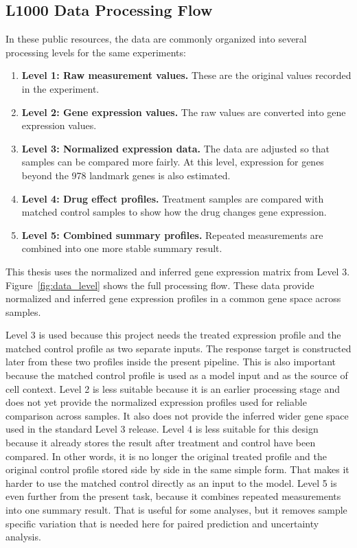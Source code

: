 \subsection{L1000 Data Processing Flow}
In these public resources, the data are commonly organized into several processing levels for the same experiments:
\begin{enumerate}
\item \textbf{Level 1: Raw measurement values.} These are the original values recorded in the experiment.
\item \textbf{Level 2: Gene expression values.} The raw values are converted into gene expression values.
\item \textbf{Level 3: Normalized expression data.} The data are adjusted so that samples can be compared more fairly. At this level, expression for genes beyond the 978 landmark genes is also estimated.
\item \textbf{Level 4: Drug effect profiles.} Treatment samples are compared with matched control samples to show how the drug changes gene expression.
\item \textbf{Level 5: Combined summary profiles.} Repeated measurements are combined into one more stable summary result.
\end{enumerate}

\noindent This thesis uses the normalized and inferred gene expression matrix from Level 3. Figure~\ref{fig:data_level} shows the full processing flow. These data provide normalized and inferred gene expression profiles in a common gene space across samples.

\noindent Level 3 is used because this project needs the treated expression profile and the matched control profile as two separate inputs. The response target is constructed later from these two profiles inside the present pipeline. This is also important because the matched control profile is used as a model input and as the source of cell context. Level 2 is less suitable because it is an earlier processing stage and does not yet provide the normalized expression profiles used for reliable comparison across samples. It also does not provide the inferred wider gene space used in the standard Level 3 release. Level 4 is less suitable for this design because it already stores the result after treatment and control have been compared. In other words, it is no longer the original treated profile and the original control profile stored side by side in the same simple form. That makes it harder to use the matched control directly as an input to the model. Level 5 is even further from the present task, because it combines repeated measurements into one summary result. That is useful for some analyses, but it removes sample specific variation that is needed here for paired prediction and uncertainty analysis.

